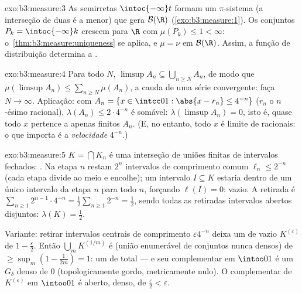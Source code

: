 \begin{solution}{exo:b3:measure:3}
As semirretas $\intoc{-\infty}t$ formam um $\pi$-sistema (a
interseção de duas é a menor) que gera $\mathcal B(\R)$
(\cref{exo:b3:measure:1}). Os conjuntos $P_k = \intoc{-\infty}k$
crescem para $\R$ com $\mu(P_k) \leq 1 < \infty$:
o~\cref{thm:b3:measure:uniqueness} se aplica, e $\mu = \nu$ em
$\mathcal B(\R)$. Assim, a função de distribuição determina a
.
\end{solution}

\begin{solution}{exo:b3:measure:4}
Para todo $N$, $\limsup A_n \subseteq \bigcup_{n \geq N}A_n$,
de modo que $\mu(\limsup A_n) \leq \sum_{n\geq N}\mu(A_n)$, a cauda de
uma série convergente: faça $N \to \infty$. Aplicação: com
$A_n = \{x \in \intcc01 : \abs{x - r_n} \leq 4^{-n}\}$
($r_n$ o $n$-ésimo racional), $\lambda(A_n) \leq 2\cdot4^{-n}$
é somável: $\lambda(\limsup A_n) = 0$, isto é, quase todo $x$
pertence a apenas finitos $A_n$. (E, no entanto, todo $x$ é limite
de racionais: o que importa é a \emph{velocidade} $4^{-n}$.)
\end{solution}

\begin{solution}{exo:b3:measure:5}
$K = \bigcap K_n$ é uma interseção de uniões finitas de intervalos
fechados: . Na etapa $n$ restam $2^n$ intervalos
de comprimento comum $\ell_n \leq 2^{-n}$ (cada etapa divide ao meio e
encolhe); um intervalo $I \subseteq K$ estaria dentro de um único
intervalo da etapa $n$ para todo $n$, forçando $\ell(I) = 0$: 
vazio. A  retirada é $\sum_{n\geq1}2^{n-1}\cdot
4^{-n} = \frac12\sum_{n\geq1}2^{-n} = \frac12$, sendo todas as retiradas
intervalos abertos disjuntos: $\lambda(K) = \frac12$.

Variante: retirar intervalos centrais de comprimento
$\varepsilon
4^{-n}$ deixa um  de  vazio $K^{(\varepsilon)}$ de
 $1 - \frac\varepsilon2$. Então $\bigcup_m
K^{(1/m)}$ é  (união enumerável de conjuntos nunca densos)
de  $\geq \sup_m(1 - \frac1{2m}) = 1$: um  de
 total --- e seu complementar em $\intoo01$ é um
$G_\delta$ denso de  $0$ (topologicamente gordo, metricamente
nulo). O complementar de $K^{(\varepsilon)}$ em $\intoo01$ é
aberto, denso, de  $\frac\varepsilon2 < \varepsilon$.
\end{solution}

